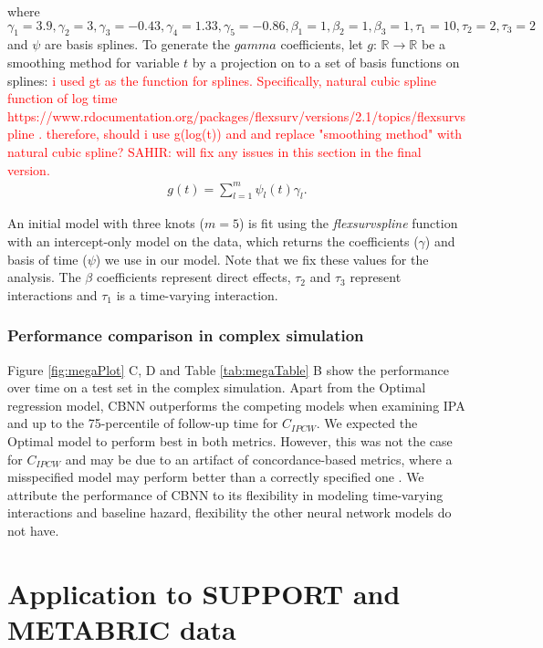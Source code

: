 \documentclass[AMA,STIX1COL,]{WileyNJD-v2}
\newcommand{\srb}[1]{\textsf{\textcolor{red}{#1}}}
\begin{document}
where
\(\gamma_{1}=3.9, \gamma_{2}=3, \gamma_{3}=-0.43, \gamma_{4}=1.33,\gamma_{5}=-0.86, \beta_{{1}}=1, \beta_{{2}}=1, \beta_{{3}}=1, \tau_{1}=10, \tau_{2}=2, \tau_{3}=2\)
and \(\psi\) are basis splines. To generate the \(gamma\) coefficients,
let \(g\): \(\mathbb{R} \rightarrow \mathbb{R}\) be a smoothing method
for variable \(t\) by a projection on to a set of basis functions on
splines:
\srb{i used gt as the function for splines. Specifically, natural cubic spline function of log time https://www.rdocumentation.org/packages/flexsurv/versions/2.1/topics/flexsurvspline . therefore, should i use g(log(t)) and and replace "smoothing method" with natural cubic spline? SAHIR: will fix any issues in this section in the final version.}
\begin{align}
g(t)=\sum^{m}_{l=1}\psi_{l} (t)\gamma_{l}.
\end{align}

An initial model with three knots (\(m=5\)) is fit using the
\emph{flexsurvspline} function with an intercept-only model on the data,
which returns the coefficients (\(\gamma\)) and basis of time (\(\psi\))
we use in our model. Note that we fix these values for the analysis. The
\(\beta\) coefficients represent direct effects, \(\tau_{2}\) and
\({\tau_3}\) represent interactions and \(\tau_{1}\) is a time-varying
interaction.

\hypertarget{performance-comparison-in-complex-simulation}{%
\subsubsection{Performance comparison in complex
simulation}\label{performance-comparison-in-complex-simulation}}

Figure \ref{fig:megaPlot} C, D and Table \ref{tab:megaTable} B show the
performance over time on a test set in the complex simulation. Apart
from the Optimal regression model, CBNN outperforms the competing models
when examining IPA and up to the 75-percentile of follow-up time for
\(C_{IPCW}\). We expected the Optimal model to perform best in both
metrics. However, this was not the case for \(C_{IPCW}\) and may be due
to an artifact of concordance-based metrics, where a misspecified model
may perform better than a correctly specified one
\citep{cindexfails2019}. We attribute the performance of CBNN to its
flexibility in modeling time-varying interactions and baseline hazard,
flexibility the other neural network models do not have.

\hypertarget{casestudies}{%
\section{Application to SUPPORT and METABRIC data}\label{casestudies}}
\end{document}
